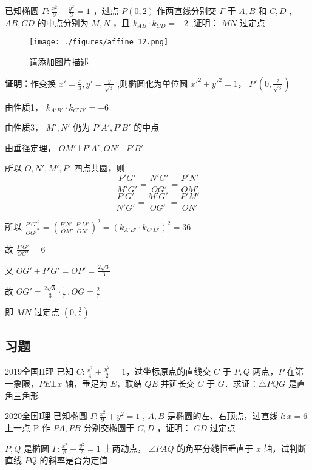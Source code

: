 \begin{example}{}
 已知椭圆 \(\Gamma:\frac{x^2}{9}+\frac{y^2}{3}=1\) ，过点 \(P(0,2)\) 作两直线分别交 \(\Gamma\) 于 \(A,B\) 和 \(C,D\) , \(AB,CD\) 的中点分别为 \(M,N\) ，且 \(k_{AB}\cdot k_{CD}=-2\) ,证明： \(MN\) 过定点
\begin{figure}[ht]
\centering
\texttt{[image: ./figures/affine\_12.png]}
\caption{请添加图片描述} \label{affine_fig12}
\end{figure}
\textbf{证明：}作变换 \(x'=\frac{x}{3},y'=\frac{y}{\sqrt{3}}\) ,则椭圆化为单位圆 \(x'^2+y'^2=1\)， \(P'\left(0,\frac{2}{\sqrt{3}}\right)\)

由性质1， \(k_{A'B'}\cdot k_{C'D'}=-6\)

由性质3， \(M',N'\) 仍为 \(P'A',P'B'\) 的中点

由垂径定理， \(OM'\bot P'A',ON'\bot P'B'\)

所以 \(O,N',M',P'\) 四点共圆，则 
$$\frac{P'G'}{M'G'}=\frac{N'G'}{OG'}=\frac{P'N'}{OM'}$$
$$\frac{P'G'}{N'G'}=\frac{M'G'}{OG'}=\frac{P'M'}{ON'}$$

所以 \(\frac{P'G'^2}{OG'^2}=\left(\frac{P'N'\cdot P'M'}{OM'\cdot ON'}\right)^2=\left(k_{A'B'}\cdot k_{C'D'}\right)^2=36\) 

故 \(\frac{P'G'}{OG'}=6\) 

又 \(OG'+P'G'=OP'=\frac{2\sqrt{3}}{3}\) 

故 \(OG'=\frac{2\sqrt{3}}{3}\cdot\frac{1}{7}\,,OG=\frac{2}{7}\) 

即 \(MN\) 过定点 \(\left(0,\frac{2}{7}\right)\) 
\end{example}
\subsection{习题}
\begin{exercise}{2019全国II理}
已知 \(C:\frac{x^2}4+\frac{y^2}2=1\)，过坐标原点的直线交 \(C\) 于 \(P,Q\) 两点，\(P\) 在第一象限，\(PE\bot x\) 轴，垂足为 \(E\)，联结 \(QE\) 并延长交 \(C\) 于 \(G\)．求证：\(\triangle PQG\) 是直角三角形
\end{exercise}
\begin{exercise}{2020全国I理}
已知椭圆 \(\Gamma:\frac{x^2}{9}+y^2=1\) , \(A,B\) 是椭圆的左、右顶点，过直线 \(l:x=6\) 上一点 P 作 \(PA,PB\) 分别交椭圆于 \(C,D\) ，证明： \(CD\) 过定点
\end{exercise}

\begin{exercise}{}
 \(P,Q\) 是椭圆 \(\Gamma:\frac{x^2}{8}+\frac{y^2}{2}=1\) 上两动点， \(\angle PAQ\) 的角平分线恒垂直于 \(x\) 轴，试判断直线 \(PQ\) 的斜率是否为定值
\end{exercise}